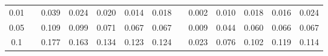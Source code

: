 % 
\begin{tabular}{ccccccccccccc}
  \hline
  \hline
0.01 &  & 0.039 & 0.024 & 0.020 & 0.014 & 0.018 &  & 0.002 & 0.010 & 0.018 & 0.016 & 0.024 \\ 
  0.05 &  & 0.109 & 0.099 & 0.071 & 0.067 & 0.067 &  & 0.009 & 0.044 & 0.060 & 0.066 & 0.067 \\ 
  0.1 &  & 0.177 & 0.163 & 0.134 & 0.123 & 0.124 &  & 0.023 & 0.076 & 0.102 & 0.119 & 0.114 \\ 
   \hline
\end{tabular}
